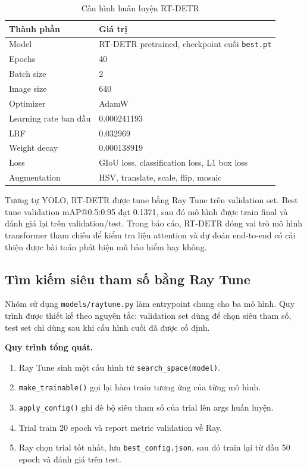 \begin{table}[H]
    \centering
    \caption{Cấu hình huấn luyện RT-DETR}
    \label{tab:rtdetr-config}
    \begin{tabular}{ll}
        \toprule
        \textbf{Thành phần} & \textbf{Giá trị} \\
        \midrule
        Model & RT-DETR pretrained, checkpoint cuối \texttt{best.pt} \\
        Epochs & 40 \\
        Batch size & 2 \\
        Image size & 640 \\
        Optimizer & AdamW \\
        Learning rate ban đầu & 0.000241193 \\
        LRF & 0.032969 \\
        Weight decay & 0.000138919 \\
        Loss & GIoU loss, classification loss, L1 box loss \\
        Augmentation & HSV, translate, scale, flip, mosaic \\
        \bottomrule
    \end{tabular}
\end{table}

Tương tự YOLO, RT-DETR được tune bằng Ray Tune trên validation set. Best tune validation mAP@0.5:0.95 đạt 0.1371, sau đó mô hình được train final và đánh giá lại trên validation/test. Trong báo cáo, RT-DETR đóng vai trò mô hình transformer tham chiếu để kiểm tra liệu attention và dự đoán end-to-end có cải thiện được bài toán phát hiện mũ bảo hiểm hay không.

\subsection{Tìm kiếm siêu tham số bằng Ray Tune}

Nhóm sử dụng \texttt{models/raytune.py} làm entrypoint chung cho ba mô hình. Quy trình được thiết kế theo nguyên tắc: validation set dùng để chọn siêu tham số, test set chỉ dùng sau khi cấu hình cuối đã được cố định.

\textbf{Quy trình tổng quát.}

\begin{enumerate}
    \item Ray Tune sinh một cấu hình từ \texttt{search\_space(model)}.
    \item \texttt{make\_trainable()} gọi lại hàm train tương ứng của từng mô hình.
    \item \texttt{apply\_config()} ghi đè bộ siêu tham số của trial lên args huấn luyện.
    \item Trial train 20 epoch và report metric validation về Ray.
    \item Ray chọn trial tốt nhất, lưu \texttt{best\_config.json}, sau đó train lại từ đầu 50 epoch và đánh giá trên test.
\end{enumerate}

